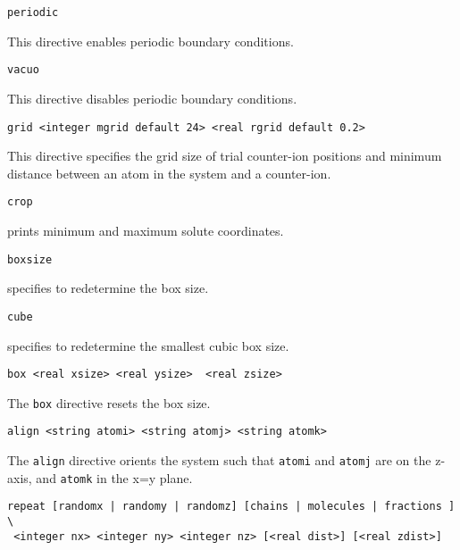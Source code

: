 \begin{verbatim}
periodic
\end{verbatim}

This directive enables periodic boundary conditions.

\begin{verbatim}
vacuo
\end{verbatim}

This directive disables periodic boundary conditions.

\begin{verbatim}
grid <integer mgrid default 24> <real rgrid default 0.2>
\end{verbatim}

This directive specifies the grid size of trial counter-ion positions and 
minimum distance between an atom in the system and a counter-ion. 

%
%

\begin{verbatim}
crop
\end{verbatim}
prints minimum and maximum solute coordinates.

\begin{verbatim}
boxsize
\end{verbatim}
specifies to redetermine the box size.

\begin{verbatim}
cube
\end{verbatim}
specifies to redetermine the smallest cubic box size.

\begin{verbatim}
box <real xsize> <real ysize>  <real zsize>
\end{verbatim}

The \verb+box+ directive resets the box size.

\begin{verbatim}
align <string atomi> <string atomj> <string atomk>
\end{verbatim}

The \verb+align+ directive orients the system such that
\verb+atomi+ and \verb+atomj+ are on the z-axis, and \verb+atomk+
in the x=y plane.

\begin{verbatim}
repeat [randomx | randomy | randomz] [chains | molecules | fractions ] \
 <integer nx> <integer ny> <integer nz> [<real dist>] [<real zdist>]
\end{verbatim}

